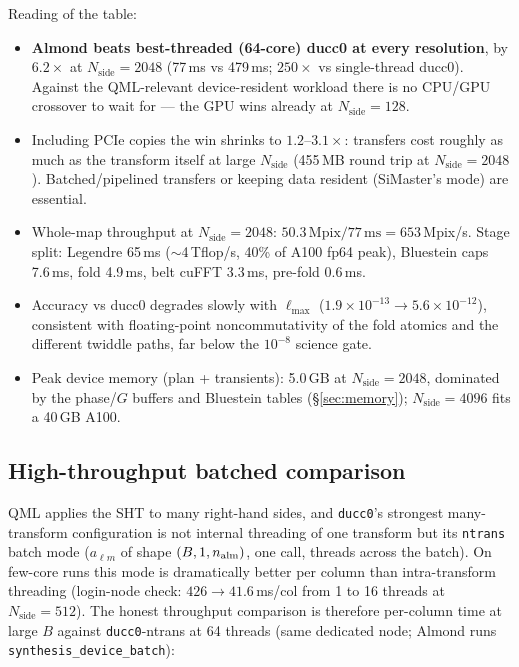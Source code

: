 \documentclass[11pt]{article}
\begin{document}
\noindent Reading of the table:
\begin{itemize}
\item \textbf{Almond beats best-threaded (64-core) ducc0 at every resolution},
  by $6.2\times$ at $N_\mathrm{side}=2048$ (77\,ms vs 479\,ms;
  $250\times$ vs single-thread ducc0).  Against the QML-relevant
  device-resident workload there is no CPU/GPU crossover to wait for ---
  the GPU wins already at $N_\mathrm{side}=128$.
\item Including PCIe copies the win shrinks to $1.2$--$3.1\times$:
  transfers cost roughly as much as the transform itself at large
  $N_\mathrm{side}$ (455\,MB round trip at $N_\mathrm{side}=2048$).
  Batched/pipelined transfers or keeping data resident (SiMaster's mode)
  are essential.
\item Whole-map throughput at $N_\mathrm{side}=2048$:
  $50.3\,\mathrm{Mpix} / 77\,\mathrm{ms} = 653$\,Mpix/s.  Stage split:
  Legendre 65\,ms ($\sim$4\,Tflop/s, 40\% of A100 fp64 peak), Bluestein
  caps 7.6\,ms, fold 4.9\,ms, belt cuFFT 3.3\,ms, pre-fold 0.6\,ms.
\item Accuracy vs ducc0 degrades slowly with $\ell_{\max}$
  ($1.9\times10^{-13} \to 5.6\times10^{-12}$), consistent with
  floating-point noncommutativity of the fold atomics and the different
  twiddle paths, far below the $10^{-8}$ science gate.
\item Peak device memory (plan + transients): 5.0\,GB at
  $N_\mathrm{side}=2048$, dominated by the phase/$G$ buffers and Bluestein
  tables (\S\ref{sec:memory}); $N_\mathrm{side}=4096$ fits a 40\,GB A100.
\end{itemize}

\subsection{High-throughput batched comparison}
\label{sec:batched}

QML applies the SHT to many right-hand sides, and \texttt{ducc0}'s
strongest many-transform configuration is not internal threading of one
transform but its \texttt{ntrans} batch mode ($a_{\ell m}$ of shape
$(B, 1, n_{\rm alm})$, one call, threads across the batch).  On few-core
runs this mode is dramatically better per column than intra-transform
threading (login-node check: $426 \to 41.6$\,ms/col from 1 to 16 threads at
$N_\mathrm{side}=512$).  The honest throughput comparison is therefore
per-column time at large $B$ against \texttt{ducc0}-ntrans at 64 threads
(same dedicated node; Almond runs \texttt{synthesis\_device\_batch}):
\end{document}
